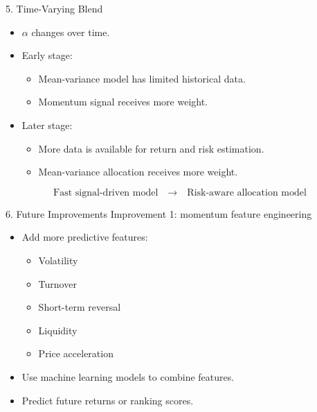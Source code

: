 \documentclass[aspectratio=169]{beamer}
\begin{document}
\begin{frame}{5. Time-Varying Blend}
  \begin{itemize}
    \item $\alpha$ changes over time.
    \item Early stage:
    \begin{itemize}
      \item Mean-variance model has limited historical data.
      \item Momentum signal receives more weight.
    \end{itemize}
    \item Later stage:
    \begin{itemize}
      \item More data is available for return and risk estimation.
      \item Mean-variance allocation receives more weight.
    \end{itemize}
  \end{itemize}

  \vspace{0.2cm}

  \[
    \text{Fast signal-driven model}
    \quad \longrightarrow \quad
    \text{Risk-aware allocation model}
  \]
\end{frame}

\begin{frame}{6. Future Improvements}
  Improvement 1: momentum feature engineering
  \begin{itemize}
    \item Add more predictive features:
    \begin{itemize}
      \item Volatility
      \item Turnover
      \item Short-term reversal
      \item Liquidity
      \item Price acceleration
    \end{itemize}
    \item Use machine learning models to combine features.
    \item Predict future returns or ranking scores.
  \end{itemize}
\end{frame}
\end{document}
